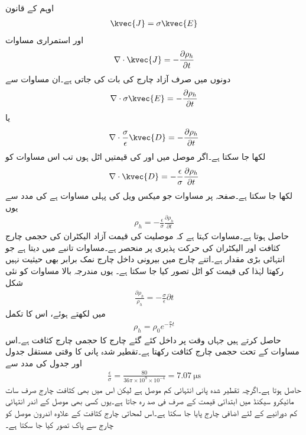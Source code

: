 اوہم کے قانون
\begin{align*}
\kvec{J}=\sigma \kvec{E}
\end{align*}
اور استمراری مساوات
\begin{align*}
\nabla \cdot \kvec{J}=-\frac{\partial \rho_h}{\partial t}
\end{align*} 
دونوں میں صرف آزاد چارج کی بات کی جاتی ہے۔ان مساوات سے
\begin{align*}
\nabla \cdot \sigma \kvec{E}=-\frac{\partial \rho_h}{\partial t}
\end{align*} 
یا
\begin{align*}
\nabla \cdot \frac{\sigma}{\epsilon} \kvec{D}=-\frac{\partial \rho_h}{\partial t}
\end{align*} 
لکھا جا سکتا ہے۔اگر موصل میں  اور  کی قیمتیں اٹل ہوں تب اس مساوات کو
\begin{align*}
\nabla \cdot  \kvec{D}=-\frac{\epsilon}{\sigma}\frac{\partial \rho_h}{\partial t}
\end{align*} 
لکھا جا سکتا ہے۔صفحہ  پر مساوات  جو میکس ویل کی پہلی مساوات ہے کی مدد سے یوں
\begin{align*}
\rho_h=-\frac{\epsilon}{\sigma}\frac{\partial \rho_h}{\partial t}
\end{align*} 
حاصل ہوتا ہے۔مساوات  کہتا ہے کہ موصلیت کی قیمت آزاد الیکٹران کی حجمی چارج کثافت  اور الیکٹران کی حرکت پذیری پر منحصر ہے۔مساوات  تانبے میں  دیتا ہے جو انتہائی بڑی مقدار ہے۔اتنے چارج میں بیرونی داخل چارج نمک برابر بھی حیثیت نہیں رکھتا لہٰذا  کی قیمت کو اٹل تصور کیا جا سکتا ہے۔ یوں مندرجہ بالا مساوات کو نئی شکل
\begin{align*}
\frac{\partial \rho_h}{\rho_h}=-\frac{\sigma}{\epsilon} \partial t
\end{align*} 
میں لکھتے ہوئے، اس کا تکمل
\begin{align*}
\rho_h=\rho_0 e^{-\frac{\sigma}{\epsilon}t}
\end{align*}
 حاصل کرتے ہیں جہاں وقت  پر داخل کئے گئے چارج کا حجمی چارج کثافت  ہے۔اس مساوات کے تحت حجمی چارج کثافت   رکھتا ہے۔تقطیر شدہ پانی کا وقتی مستقل جدول  اور جدول  کی مدد سے
\begin{align*}
\frac{\epsilon}{\sigma}=\frac{80}{36 \pi \times 10^9 \times 10^{-4}}=\SI{7.07}{\micro \second}
\end{align*}
حاصل ہوتا ہے۔اگرچہ تقطیر شدہ پانی انتہائی کم موصل ہے لیکن اس میں بھی  کثافت چارج صرف سات مائیکرو سیکنڈ میں ابتدائی قیمت کے صرف   فی صد رہ جاتا ہے۔یوں کسی بھی موصل کے اندر انتہائی کم دورانیے کے لئے اضافی چارج پایا جا سکتا ہے۔اس لمحاتی چارج کثافت کے علاوہ اندرون موصل  کو چارج سے پاک تصور کیا جا سکتا ہے۔

